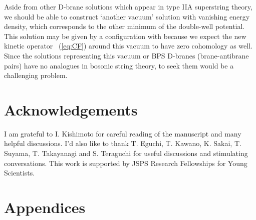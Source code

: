 \documentclass[a4paper,12pt]{article}
\providecommand{\cQ}{\mathcal{Q}}
\begin{document}
Aside from other D-brane solutions which appear in type IIA superstring theory, we should 
be able to construct `another vacuum' solution with vanishing energy density, which corresponds 
to the other minimum of the double-well potential. 
This solution may be given by a configuration \myHighlight{$\widehat{\Phi}$}\coordHE{} with \coordHE{} 
because we expect the new kinetic operator \myHighlight{$\cQ^{\prime}$}\coordHE{}~(\ref{eq:CF}) around this vacuum to have 
zero cohomology as well. Since the solutions representing this vacuum or BPS D-branes (brane-antibrane 
pairs) have no analogues in bosonic string theory, to seek them would be a challenging problem. 

\section*{Acknowledgements}
I am grateful to I. Kishimoto for careful reading of the manuscript and many helpful discussions. 
I'd also like to thank T. Eguchi, T. Kawano, K. Sakai, T. Suyama, T. Takayanagi and S. Teraguchi   
for useful discussions and stimulating conversations. This work is supported by JSPS Research 
Fellowships for Young Scientists. 


\section*{Appendices}
\renewcommand{\thesection}{\Alph{section}}
\setcounter{section}{0}
\end{document}
